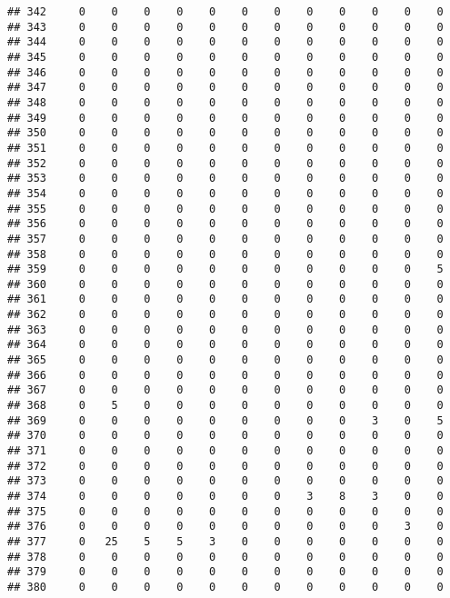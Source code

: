 \documentclass[]{article}
\begin{document}
\begin{verbatim}
## 342     0    0    0    0    0    0    0    0    0    0    0    0
## 343     0    0    0    0    0    0    0    0    0    0    0    0
## 344     0    0    0    0    0    0    0    0    0    0    0    0
## 345     0    0    0    0    0    0    0    0    0    0    0    0
## 346     0    0    0    0    0    0    0    0    0    0    0    0
## 347     0    0    0    0    0    0    0    0    0    0    0    0
## 348     0    0    0    0    0    0    0    0    0    0    0    0
## 349     0    0    0    0    0    0    0    0    0    0    0    0
## 350     0    0    0    0    0    0    0    0    0    0    0    0
## 351     0    0    0    0    0    0    0    0    0    0    0    0
## 352     0    0    0    0    0    0    0    0    0    0    0    0
## 353     0    0    0    0    0    0    0    0    0    0    0    0
## 354     0    0    0    0    0    0    0    0    0    0    0    0
## 355     0    0    0    0    0    0    0    0    0    0    0    0
## 356     0    0    0    0    0    0    0    0    0    0    0    0
## 357     0    0    0    0    0    0    0    0    0    0    0    0
## 358     0    0    0    0    0    0    0    0    0    0    0    0
## 359     0    0    0    0    0    0    0    0    0    0    0    5
## 360     0    0    0    0    0    0    0    0    0    0    0    0
## 361     0    0    0    0    0    0    0    0    0    0    0    0
## 362     0    0    0    0    0    0    0    0    0    0    0    0
## 363     0    0    0    0    0    0    0    0    0    0    0    0
## 364     0    0    0    0    0    0    0    0    0    0    0    0
## 365     0    0    0    0    0    0    0    0    0    0    0    0
## 366     0    0    0    0    0    0    0    0    0    0    0    0
## 367     0    0    0    0    0    0    0    0    0    0    0    0
## 368     0    5    0    0    0    0    0    0    0    0    0    0
## 369     0    0    0    0    0    0    0    0    0    3    0    5
## 370     0    0    0    0    0    0    0    0    0    0    0    0
## 371     0    0    0    0    0    0    0    0    0    0    0    0
## 372     0    0    0    0    0    0    0    0    0    0    0    0
## 373     0    0    0    0    0    0    0    0    0    0    0    0
## 374     0    0    0    0    0    0    0    3    8    3    0    0
## 375     0    0    0    0    0    0    0    0    0    0    0    0
## 376     0    0    0    0    0    0    0    0    0    0    3    0
## 377     0   25    5    5    3    0    0    0    0    0    0    0
## 378     0    0    0    0    0    0    0    0    0    0    0    0
## 379     0    0    0    0    0    0    0    0    0    0    0    0
## 380     0    0    0    0    0    0    0    0    0    0    0    0

\end{verbatim}
\end{document}
